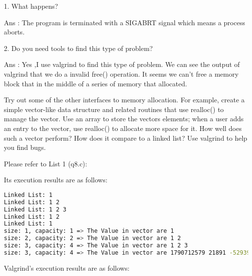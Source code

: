 \documentclass[10pt, answers]{exam}
\begin{document}
\begin{questions}
\begin{solution}
    1. What happens?
    
    Ans : The program is terminated with a SIGABRT signal which means 
    a process aborts.

    2. Do you need tools to find this type of problem?

    Ans : Yes ,I use valgrind to find this type of problem.
    We can see the output of valgrind that we do a invalid free() operation.
    It seems we can't free a memory block that in the 
    middle of a series of memory that allocated.

    \end{solution}
    
    
    
    \end{questions}

\begin{questions} 
    \setcounter{question}{7} 
    
    \question 
    Try out some of the other interfaces to memory allocation. For example, create a simple vector-like data structure and related routines that use realloc() to manage the vector. Use an array to
    store the vectors elements; when a user adds an entry to the vector, use realloc() to allocate more space for it. How well does
    such a vector perform? How does it compare to a linked list? Use
    valgrind to help you find bugs.


    
    \begin{solution}
    Please refer to List 1 (q8.c):
    
    
    
    Its execution results are as follows:
    
    \begin{lstlisting}[language=bash]
Linked List: 1
Linked List: 1 2
Linked List: 1 2 3
Linked List: 1 2
Linked List: 1
size: 1, capacity: 1 => The Value in vector are 1
size: 2, capacity: 2 => The Value in vector are 1 2
size: 3, capacity: 4 => The Value in vector are 1 2 3
size: 3, capacity: 4 => The Value in vector are 1790712579 21891 -529391540
    \end{lstlisting}
    
    Valgrind's execution results are as follows:
    

\end{solution}
\end{questions}
\end{document}
